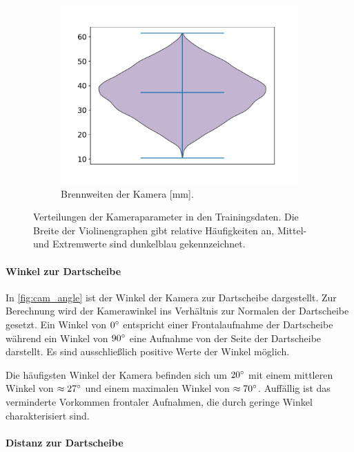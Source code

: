 \begin{figure}
    \begin{subfigure}{0.475\textwidth}
        \centering
        \includegraphics[width=\textwidth]{imgs/rendering/ergebnisse/cam_focal.pdf}
        \caption{Brennweiten der Kamera [mm].}
        \label{fig:cam_focal}
    \end{subfigure}
    \caption{Verteilungen der Kameraparameter in den Trainingsdaten. Die Breite der Violinengraphen gibt relative Häufigkeiten an, Mittel- und Extremwerte sind dunkelblau gekennzeichnet.}
    \label{img:kamera_meta}
\end{figure}

\paragraph{Winkel zur Dartscheibe}

In \autoref{fig:cam_angle} ist der Winkel der Kamera zur Dartscheibe dargestellt. Zur Berechnung wird der Kamerawinkel ins Verhältnis zur Normalen der Dartscheibe gesetzt. Ein Winkel von $0^{\circ}$ entspricht einer Frontalaufnahme der Dartscheibe während ein Winkel von $90^{\circ}$ eine Aufnahme von der Seite der Dartscheibe darstellt. Es sind ausschließlich positive Werte der Winkel möglich.

Die häufigsten Winkel der Kamera befinden sich um $20^{\circ}$ mit einem mittleren Winkel von $\approx27^{\circ}$ und einem maximalen Winkel von $\approx70^{\circ}$. Auffällig ist das verminderte Vorkommen frontaler Aufnahmen, die durch geringe Winkel charakterisiert sind.

\paragraph{Distanz zur Dartscheibe}

